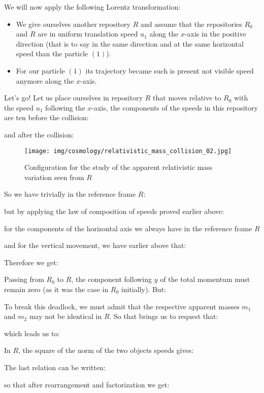 	We will now apply the following Lorentz transformation:
	\begin{itemize}
		\item We give ourselves another repository $R$ and assume that the repositories $R_0$ and $R$ are in uniform translation speed $u_1$ along the $x$-axis in the positive direction (that is to say in the same direction and at the same horizontal speed than the particle $(1)$).
		
		\item For our particle $(1)$ its trajectory became such is present not visible speed anymore along the $x$-axis.
	\end{itemize}
	Let's go! Let us place ourselves in repository $R$ that moves relative to $R_0$ with the speed $u_1$ following the $x$-axis, the components of the speeds in this repository are ten before the collision:
	
	and after the collision:
	
	\begin{figure}[H]
		\begin{center}
		\texttt{[image: img/cosmology/relativistic\_mass\_collision\_02.jpg]}
		\caption{Configuration for the study of the apparent relativistic mass variation seen from $R$}
		\end{center}
	\end{figure}
	So we have trivially in the reference frame $R$:
	
	but by applying the law of composition of speeds proved earlier above:
	
	for the components of the horizontal axis we always have in the reference frame $R$
	
	and for the vertical movement, we have earlier above that:
	
	Therefore we get:
	
	Passing from $R_0$ to $R$, the component following $y$ of the total momentum must remain zero (as it was the case in $R_0$ initially). But:
	
	To break this deadlock, we must admit that the respective apparent masses $m_1$ and $m_2$ may not be identical in $R$. So that brings us to request that:
	
	which leads us to:
	
	In $R$, the square of the norm of the two objects speeds gives:
	
	The last relation can be written:
	
	so that after rearrangement and factorization we get:
	
